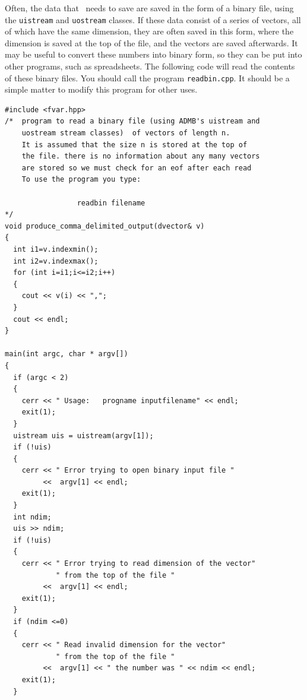 \documentclass{admbmanual}
\begin{document}
Often, the data that \ADM\ needs to save are saved in the form
of a binary file, using the \texttt{uistream} and \texttt{uostream} classes. 
If these data consist of a series of vectors,
all of which have the same dimension, they are often saved in this
form, where the dimension is saved at the top of the file,
and the vectors are saved afterwards. It may be useful to
convert these numbers into binary form, so they can be
put into other programs, such as spreadsheets.
The following code will read the contents of these binary files.
You should call the program \texttt{readbin.cpp}. It should be
a simple matter to modify this program for other uses.
\begin{lstlisting}
#include <fvar.hpp>
/*  program to read a binary file (using ADMB's uistream and
    uostream stream classes)  of vectors of length n.
    It is assumed that the size n is stored at the top of
    the file. there is no information about any many vectors
    are stored so we must check for an eof after each read
    To use the program you type:

                 readbin filename
*/
void produce_comma_delimited_output(dvector& v)
{
  int i1=v.indexmin();
  int i2=v.indexmax();
  for (int i=i1;i<=i2;i++)
  {
    cout << v(i) << ",";
  }
  cout << endl;
}

main(int argc, char * argv[])
{
  if (argc < 2)
  {
    cerr << " Usage:   progname inputfilename" << endl;
    exit(1);
  }
  uistream uis = uistream(argv[1]);
  if (!uis)
  {  
    cerr << " Error trying to open binary input file " 
         <<  argv[1] << endl;
    exit(1);
  }
  int ndim;
  uis >> ndim;
  if (!uis)
  {  
    cerr << " Error trying to read dimension of the vector"
            " from the top of the file " 
         <<  argv[1] << endl;
    exit(1);
  }
  if (ndim <=0)
  {  
    cerr << " Read invalid dimension for the vector"
            " from the top of the file " 
         <<  argv[1] << " the number was " << ndim << endl;
    exit(1);
  }
  

\end{lstlisting}
\end{document}
